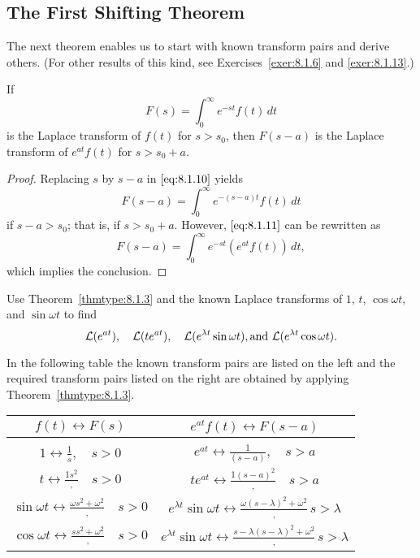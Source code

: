 \documentclass{ximera}
\begin{document}
\subsection*{The First Shifting Theorem}

The next theorem enables us to start with known transform pairs and derive others. (For other results of this kind, see Exercises~\ref{exer:8.1.6}  and
\ref{exer:8.1.13}.)

\begin{theorem}\label{thmtype:8.1.3}
 If
\begin{equation}\label{eq:8.1.10}
F(s)=\int_0^\infty e^{-st} f(t)\,dt
\end{equation}
is the Laplace transform of $f(t)$ for $s>s_0$, then $F(s-a)$ is the
Laplace transform of $e^{at}f(t)$ for $s >s_0+a$.
\end{theorem}

\begin{proof}
Replacing $s$ by $s-a$ in  $\eqref{eq:8.1.10}$ yields
\begin{equation}\label{eq:8.1.11}
F(s-a)=\int_0^\infty e^{-(s-a)t}f(t)\,dt
\end{equation}
if $s-a>s_0$; that is, if $s>s_0+a$.  However,  $\eqref{eq:8.1.11}$ can
be rewritten as
$$
F(s-a)=\int_0^\infty e^{-st}\left(e^{at}f(t)\right)\,dt,
$$
which implies the conclusion.
\end{proof}

\begin{example}\label{example:8.1.7}
  Use Theorem~\ref{thmtype:8.1.3} and the known Laplace
transforms of $1$, $t$, $\cos\omega t$, and $\sin\omega t$ to find
$$
{\cal L}(e^{at}),\quad {\cal L}(te^{at}),\quad {\cal L}(e^{\lambda t}\sin
\omega t),\mbox{and } {\cal L}(e^{\lambda t}\cos\omega t).
$$
\begin{explanation}
In the following table the known
transform pairs  are listed on the left and  the required  transform pairs
listed on the right are obtained  by applying
Theorem~\ref{thmtype:8.1.3}.

\begin{center}
\begin{tabular}{|c|c|}\hline
$f(t)\leftrightarrow F(s)$ & $e^{at}f(t)\leftrightarrow F(s-a)$ \\\hline
&\\ $1\leftrightarrow\frac{1}{s},\quad s>0$ &
 $e^{at}\leftrightarrow\frac{1}{(s-a)},\quad s>a$\\
  $t\leftrightarrow\frac{{1}{s^2}},\quad s>0$ &
$te^{at}\leftrightarrow\frac{{1}{(s-a)^2}},\quad s>a$\\
$\sin\omega t\leftrightarrow\frac{{\omega}{s^2+\omega^2}},\quad s>0$&
$e^{\lambda t}\sin\omega t\leftrightarrow\frac{{\omega}{(s-\lambda)^2+\omega^2}},\,s>\lambda$\\
$\cos\omega t\leftrightarrow\frac{{s}{s^2+\omega^2}},\quad s>0$ &
$e^{\lambda t}\sin\omega t\leftrightarrow\frac{{s-\lambda}{(s-\lambda)^2+\omega^2}},\,s>\lambda$\\\hline
\end{tabular}
\end{center}
\end{explanation}
\end{example}
\end{document}
